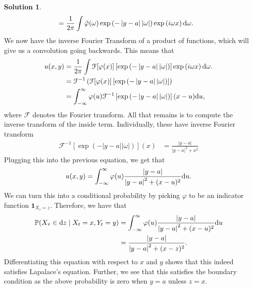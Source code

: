 \documentclass[12pt]{article}
\newcommand{\Prob}{\mathbb{P}}
\newcommand{\abs}[1]{ \left| #1 \right| }
\renewcommand{\phi}{\varphi}
\theoremstyle{definition}
\newtheorem{sol}{Solution}
\theoremstyle{remark}
\def\d{{\rm d}}
\begin{document}
\begin{sol}
\begin{align*}
              &= \frac{1}{2\pi} \int \hat{\phi}(\omega) \exp\left( -\abs{y - a} \abs{\omega}\right) \exp\left(i\omega x \right) \d \omega.
\end{align*}
We now have the inverse Fourier Transform of a product of functions, which will give us a convolution going backwards. This means that
\begin{align*}
    u(x,y) &= \frac{1}{2\pi} \int \mathcal{F}[\phi(x)] \left[\exp\left( - \abs{y - a} \abs{\omega}\right)  \right] \exp\left(i\omega x \right) \d \omega.\\
           &= \mathcal{F}^{-1} \left( \mathcal{F}[\phi(x)] \left[\exp\left(- \abs{y - a} \abs{ \omega }\right)  \right] \right) \\
           &= \int_{-\infty}^{\infty} \phi(u) \mathcal{F}^{-1}\left[ \exp\left(- \abs{y - a} \abs{ \omega}\right)  \right](x-u) \d u,
\end{align*}
where $\mathcal{F}$ denotes the Fourier transform. All that remains is to compute the inverse transform of the inside term. 
Individually, these have inverse Fourier transform
\begin{align*}
    \mathcal{F}^{-1} \left[\exp\left(- \abs{y - a} \abs{\omega}\right)\right](x) &=  \frac{\abs{y - a}}{\abs{y-a}^{2} + x^{2}}
\end{align*}
Plugging this into the previous equation, we get that
\begin{align*}
    u(x, y) = \int_{-\infty}^{\infty} \phi(u) \frac{\abs{y - a}}{\abs{y-a}^{2} + (x - u)^{2}}  \d u.
\end{align*}
We can turn this into a conditional probability by picking $\phi$ to be an indicator function  $\mathbf{1}_{X_{\tau} = z}$. Therefore, we have that
\begin{align*}
    \Prob(X_{\tau} \in \d z \mid X_{t} = x, Y_{t} = y) &= \int_{-\infty}^{\infty} \phi(u) \frac{\abs{y - a}}{\abs{y-a}^{2} + (x - u)^{2}} \d u\\
                             &= \frac{\abs{y-a}}{\abs{y - a}^{2} + (x-z)^{2}}.
\end{align*}
Differentiating this equation with respect to $x$ and $y$ shows that this indeed satisfies Lapalace's equation. Further, we see that this satisfies the boundary condition as the above probability is zero when $y = a$ unless $z = x$.
\end{sol}


\newpage
\end{document}
